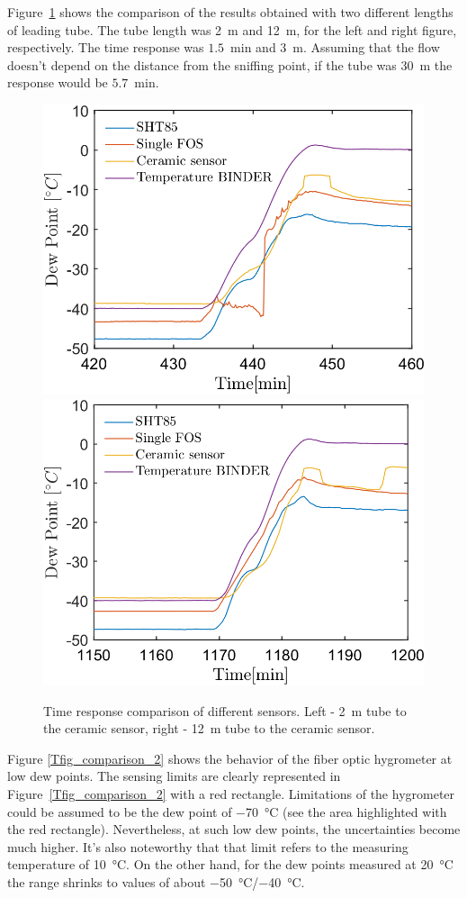 Figure~\ref{fig_comparison_hw} shows the comparison of the results obtained with two different lengths of leading tube. The tube length was \SI{2}{\metre} and \SI{12}{\metre}, for the left and right figure, respectively. The time response was $1.5$~min and $3$~m. Assuming that the flow doesn't depend on the distance from the sniffing point, if the tube was $30$~m the response would be $5.7$~min. 
\begin{figure}[!h]
\centering
\includegraphics[width=0.47\columnwidth]{Chapter5/images/DPCPercent_response2m.png}
\includegraphics[width=0.47\columnwidth]{Chapter5/images/DPCPercent_response12m.png}
\caption{Time response comparison of different sensors. Left - \SI{2}{\metre} tube to the ceramic sensor, right - \SI{12}{\metre} tube to the ceramic sensor.}
\label{fig_comparison_hw}
\end{figure}
\newpage
Figure \ref{Tfig_comparison_2} shows the behavior of the fiber optic hygrometer at low dew points. The sensing limits are clearly represented in Figure~\ref{Tfig_comparison_2} with a red rectangle. Limitations of the hygrometer could be assumed to be the dew point of \SI{-70}{\celsius} (see the area highlighted with the red rectangle). Nevertheless, at such low dew points, the uncertainties become much higher. It's also noteworthy that that limit refers to the measuring temperature of \SI{10}{\celsius}. On the other hand, for the dew points measured at \SI{20}{\celsius} the range shrinks to values of about \SI{-50}{\celsius}/\SI{-40}{\celsius}.

